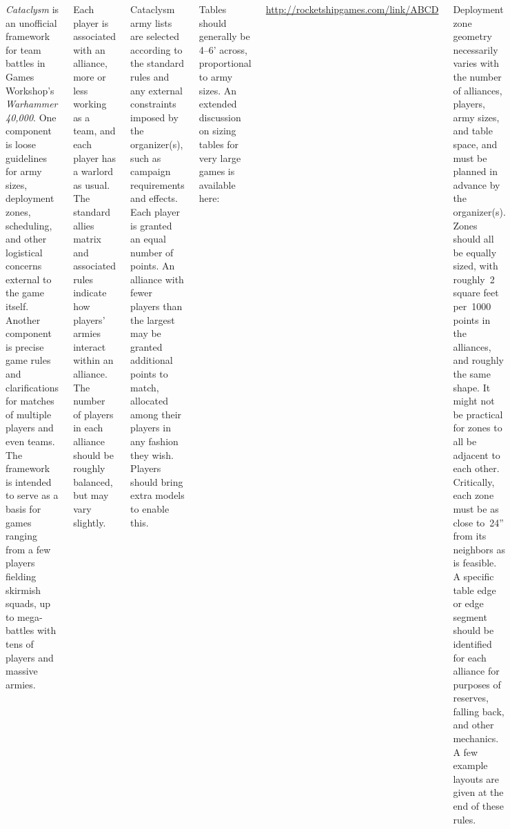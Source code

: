 \documentclass{40k}
\begin{document}

\begin{columns}

  \emph{Cataclysm} is an unofficial framework for team battles in
  Games Workshop's \emph{Warhammer 40,000}.  One component is loose
  guidelines for army sizes, deployment zones, scheduling, and other
  logistical concerns external to the game itself.  Another component
  is precise game rules and clarifications for matches of multiple
  players and even teams.  The framework is intended to serve as a
  basis for games ranging from a few players fielding skirmish squads,
  up to mega-battles with tens of players and massive armies.

%

Each player is associated with an alliance, more or less working as a
team, and each player has a warlord as usual.  The standard allies
matrix and associated rules indicate how players' armies interact
within an alliance.  The number of players in each alliance should be
roughly balanced, but may vary slightly.


%

Cataclysm army lists are selected according to the standard rules and
any external constraints imposed by the organizer(s), such as campaign
requirements and effects.  Each player is granted an equal number of
points.  An alliance with fewer players than the largest may be
granted additional points to match, allocated among their players in
any fashion they wish.  Players should bring extra models to enable
this.

%

Tables should generally be 4--6' across, proportional to army sizes.
An extended discussion on sizing tables for very large games is
available here:
\centerline{\url{http://rocketshipgames.com/link/ABCD}}

Deployment zone geometry necessarily varies with the number of
alliances, players, army sizes, and table space, and must be planned
in advance by the organizer(s).  Zones should all be equally sized,
with roughly~2 square feet per~1000 points in the alliances, and
roughly the same shape.  It might not be practical for zones to all be
adjacent to each other.  Critically, each zone must be as close
to~24'' from its neighbors as is feasible.  A specific table edge or
edge segment should be identified for each alliance for purposes of
reserves, falling back, and other mechanics.  A few example layouts
are given at the end of these rules.


\end{columns}
\end{document}
